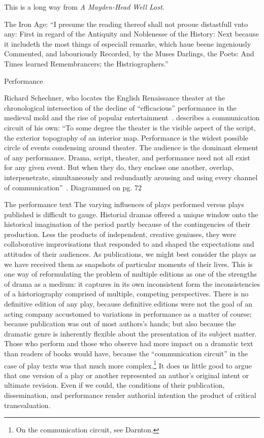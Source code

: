 This is a long way from \emph{A Mayden-Head Well Lost}.

The Iron Age:
``I presume the reading thereof shall not prooue distastfull vnto any: First in regard of the Antiquity and Noblenesse of the History: Next because it includeth the most things of especiall remarke, which haue beene ingeniously Commented, and labouriously Recorded, by the Muses Darlings, the Poets: And Times learned Remembrancers; the Histriographers.''~\cite[N. pag.]{heywood_reader_1632}


Performance

Richard Schechner, who locates the English Renaissance theater at the chronological intersection of the decline of ``efficacious'' performance in the medieval mold and the rise of popular entertainment~\cite[123]{schechner_performance_1988}. describes a communication circuit of his own: ``To some degree the theater is the visible aspect of the script, the exterior topography of an interior map. Performance is the widest possible circle of events condensing around theater. The audience is the dominant element of any performance. Drama, script, theater, and performance need not all exist for any given event. But when they do, they enclose one another, overlap, interpenetrate, simultaneously and redundantly arousing and using every channel of communication''~\cite[91]{schechner_performance_1988}. Diagrammed on pg. 72

The performance text
The varying influences of plays performed versus plays published is difficult to gauge. Historial dramas offered a unique window onto the historical imagination of the period partly because of the contingencies of their production. Less the products of independent, creative geniuses, they were collaborative improvisations that responded to and shaped the expectations and attitudes of their audiences. As publications, we might best consider the plays as we have received them as snapshots of particular moments of their lives. This is one way of reformulating the problem of multiple editions as one of the strengths of drama as a medium: it captures in its own inconsistent form the inconsistencies of a historiography comprised of multiple, competing perspectives. There is no definitive edition of any play, because definitive editions were not the goal of an acting company accustomed to variations in performance as a matter of course; because publication was out of most authors's hands; but also because the dramatic genre is inherently flexible about the presentation of its subject matter. Those who perform and those who observe had more impact on a dramatic text than readers of books would have, because the ``communication circuit'' in the case of play texts was that much more complex.\footnote{On the communication circuit, see Darnton.\nocite{darnton_what_1990}} It does us little good to argue that one version of a play or another represented an author's original intent or ultimate revision. Even if we could, the conditions of their publication, dissemination, and performance render authorial intention the product of critical transvaluation.

